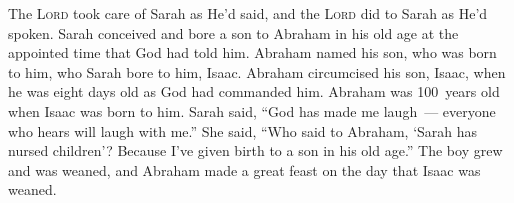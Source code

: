 
\begin{inparaenum}
     The \textsc{Lord} took care of Sarah as He'd said, and the \textsc{Lord} did to Sarah as He'd spoken.%
     Sarah conceived and bore a son to Abraham in his old age at the appointed time that God had told him.%
     Abraham named his son, who was born to him, who Sarah bore to him, Isaac.%
     Abraham circumcised his son, Isaac, when he was eight days old as God had commanded him.%
     Abraham was 100~years old when Isaac was born to him.%
     Sarah said, ``God has made me laugh~--- everyone who hears will laugh with me.''%
     She said, ``Who said to Abraham, `Sarah has nursed children'? Because I've given birth to a son in his old age.''%
     The boy grew and was weaned, and Abraham made a great feast on the day that Isaac was weaned.%
\end{inparaenum}
